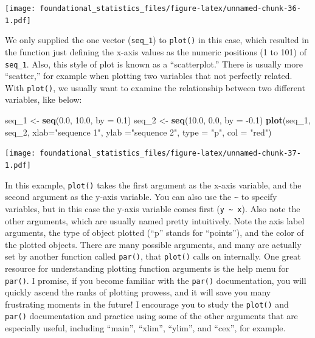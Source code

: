 \documentclass[]{book}
\newenvironment{Shaded}{\begin{snugshade}}{\end{snugshade}}
\newcommand{\DataTypeTok}[1]{\textcolor[rgb]{0.13,0.29,0.53}{#1}}
\newcommand{\DecValTok}[1]{\textcolor[rgb]{0.00,0.00,0.81}{#1}}
\newcommand{\FloatTok}[1]{\textcolor[rgb]{0.00,0.00,0.81}{#1}}
\newcommand{\KeywordTok}[1]{\textcolor[rgb]{0.13,0.29,0.53}{\textbf{#1}}}
\newcommand{\NormalTok}[1]{#1}
\newcommand{\StringTok}[1]{\textcolor[rgb]{0.31,0.60,0.02}{#1}}
\begin{document}
\texttt{[image: foundational\_statistics\_files/figure-latex/unnamed-chunk-36-1.pdf]}

We only supplied the one vector (\texttt{seq\_1}) to \texttt{plot()} in this case, which resulted in the function just defining the x-axis values as the numeric positions (1 to 101) of \texttt{seq\_1}. Also, this style of plot is known as a ``scatterplot.'' There is usually more ``scatter,'' for example when plotting two variables that not perfectly related. With \texttt{plot()}, we usually want to examine the relationship between two different variables, like below:

\begin{Shaded}
\begin{Highlighting}[]
\NormalTok{seq_}\DecValTok{1}\NormalTok{ <-}\StringTok{ }\KeywordTok{seq}\NormalTok{(}\FloatTok{0.0}\NormalTok{, }\FloatTok{10.0}\NormalTok{, }\DataTypeTok{by =} \FloatTok{0.1}\NormalTok{)}
\NormalTok{seq_}\DecValTok{2}\NormalTok{ <-}\StringTok{ }\KeywordTok{seq}\NormalTok{(}\FloatTok{10.0}\NormalTok{, }\FloatTok{0.0}\NormalTok{, }\DataTypeTok{by =} \FloatTok{-0.1}\NormalTok{)}
\KeywordTok{plot}\NormalTok{(seq_}\DecValTok{1}\NormalTok{, seq_}\DecValTok{2}\NormalTok{, }\DataTypeTok{xlab=}\StringTok{"sequence 1"}\NormalTok{, }\DataTypeTok{ylab =}\StringTok{"sequence 2"}\NormalTok{, }\DataTypeTok{type =} \StringTok{"p"}\NormalTok{, }\DataTypeTok{col =} \StringTok{"red"}\NormalTok{)}
\end{Highlighting}
\end{Shaded}

\texttt{[image: foundational\_statistics\_files/figure-latex/unnamed-chunk-37-1.pdf]}

In this example, \texttt{plot()} takes the first argument as the x-axis variable, and the second argument as the y-axis variable. You can also use the \texttt{\textasciitilde{}} to specify variables, but in this case the y-axis variable comes first (\texttt{y\ \textasciitilde{}\ x}). Also note the other arguments, which are usually named pretty intuitively. Note the axis label arguments, the type of object plotted (``p'' stands for ``points''), and the color of the plotted objects. There are many possible arguments, and many are actually set by another function called \texttt{par()}, that \texttt{plot()} calls on internally. One great resource for understanding plotting function arguments is the help menu for \texttt{par()}. I promise, if you become familiar with the \texttt{par()} documentation, you will quickly ascend the ranks of plotting prowess, and it will save you many frustrating moments in the future! I encourage you to study the \texttt{plot()} and \texttt{par()} documentation and practice using some of the other arguments that are especially useful, including ``main'', ``xlim'', ``ylim'', and ``cex'', for example.
\end{document}

